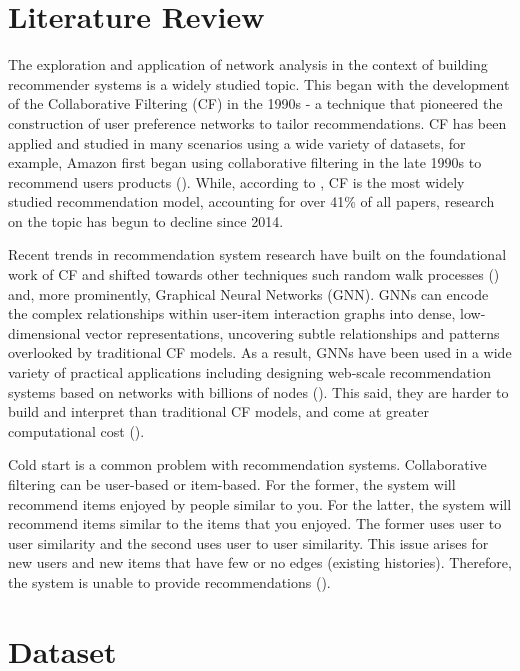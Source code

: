 \documentclass[12pt]{article}
\numberwithin{equation}{section}
\begin{document}
\section{Literature Review}

The exploration and application of network analysis in the context of building recommender systems is a widely studied topic. This began with the development of the Collaborative Filtering (CF) in the 1990s - a technique that pioneered the construction of user preference networks to tailor recommendations. CF has been applied and studied in many scenarios using a wide variety of datasets, for example, Amazon first began using collaborative filtering in the late 1990s to recommend users products (\cite{collab_f}). While, according to \cite{survey_reccomendation}, CF is the most widely studied recommendation model, accounting for over 41\% of all papers, research on the topic has begun to decline since 2014.

Recent trends in recommendation system research have built on the foundational work of CF and shifted towards other techniques such random walk processes (\cite{prob_s}) and, more prominently, Graphical Neural Networks (GNN). GNNs can encode the complex relationships within user-item interaction graphs into dense, low-dimensional vector representations,  uncovering subtle relationships and patterns overlooked by traditional CF models. As a result, GNNs have been used in a wide variety of practical applications including designing web-scale recommendation systems based on networks with billions of nodes (\cite{GNNwebscale}). This said, they are harder to build and interpret than traditional CF models, and come at greater computational cost (\cite{collab_f}). 

Cold start is a common problem with recommendation systems. Collaborative filtering can be user-based or item-based. For the former, the system will recommend items enjoyed by people similar to you. For the latter, the system will recommend items similar to the items that you enjoyed. The former uses user to user similarity and the second uses user to user similarity. This issue arises for new users and new items that have few or no edges (existing histories). Therefore, the system is unable to provide recommendations (\cite{coldstart}).  


\section{Dataset}
\end{document}
